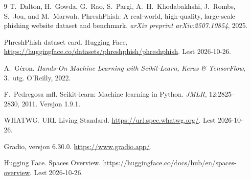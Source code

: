 \documentclass[11pt,a4paper]{article}
\begin{document}
\begin{thebibliography}{9}
\small
{}
T.~Dalton, H.~Gowda, G.~Rao, S.~Pargi, A.~H.~Khodabakhshi, J.~Rombs, S.~Jou, and M.~Marwah.
\newblock PhreshPhish: A real-world, high-quality, large-scale phishing website dataset and benchmark.
\newblock \emph{arXiv preprint arXiv:2507.10854}, 2025.

PhreshPhish dataset card. Hugging Face, \url{https://huggingface.co/datasets/phreshphish/phreshphish}. Lest 2026-10-26.

A.~Géron. \emph{Hands-On Machine Learning with Scikit-Learn, Keras \& TensorFlow}, 3.~utg. O'Reilly, 2022.

F.~Pedregosa mfl. Scikit-learn: Machine learning in Python. \emph{JMLR}, 12:2825--2830, 2011. Versjon 1.9.1.

WHATWG. URL Living Standard. \url{https://url.spec.whatwg.org/}. Lest 2026-10-26.

Gradio, versjon 6.30.0. \url{https://www.gradio.app/}.

Hugging Face. Spaces Overview. \url{https://huggingface.co/docs/hub/en/spaces-overview}. Lest 2026-10-26.
\end{thebibliography}
\end{document}
